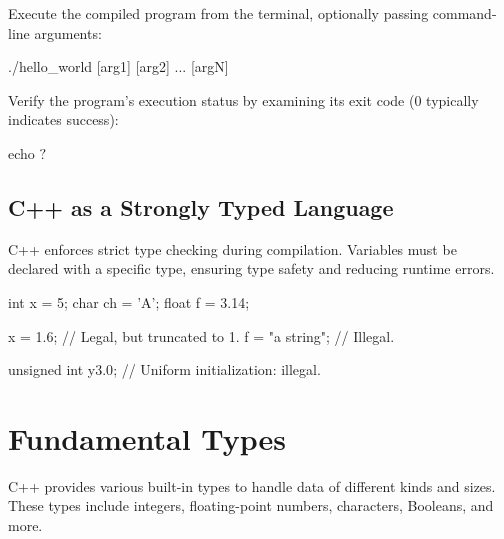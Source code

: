 Execute the compiled program from the terminal, optionally passing command-line arguments:

\begin{codeblock}[language=bash, numbers=none]
./hello_world [arg1] [arg2] ... [argN]
\end{codeblock}

Verify the program's execution status by examining its exit code (0 typically indicates success):
\begin{codeblock}[language=bash, numbers=none]
echo $?$
\end{codeblock}

\subsection{C++ as a Strongly Typed Language}

C++ enforces strict type checking during compilation. Variables must be declared with a specific type, ensuring type safety and reducing runtime errors. 

\begin{exampleblock}
    \begin{codeblock}[language=C++]
int x = 5;
char ch = 'A';
float f = 3.14;

x = 1.6;        // Legal, but truncated to 1.
f = "a string"; // Illegal.

unsigned int y{3.0}; // Uniform initialization: illegal.
    \end{codeblock}
\end{exampleblock}

\section{Fundamental Types}

C++ provides various built-in types to handle data of different kinds and sizes. These types include integers, floating-point numbers, characters, Booleans, and more.

